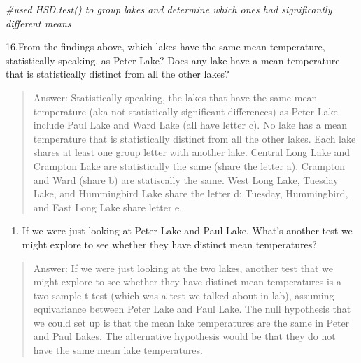 \documentclass[
]{article}
\newenvironment{Shaded}{\begin{snugshade}}{\end{snugshade}}
\newcommand{\CommentTok}[1]{\textcolor[rgb]{0.56,0.35,0.01}{\textit{#1}}}
\providecommand{\tightlist}{%
  \setlength{\itemsep}{0pt}\setlength{\parskip}{0pt}}
\begin{document}
\begin{Shaded}
\begin{Highlighting}[]
\CommentTok{\#used HSD.test() to group lakes and determine which ones had significantly different means}
\end{Highlighting}
\end{Shaded}

16.From the findings above, which lakes have the same mean temperature,
statistically speaking, as Peter Lake? Does any lake have a mean
temperature that is statistically distinct from all the other lakes?

\begin{quote}
Answer: Statistically speaking, the lakes that have the same mean
temperature (aka not statistically significant differences) as Peter
Lake include Paul Lake and Ward Lake (all have letter c). No lake has a
mean temperature that is statistically distinct from all the other
lakes. Each lake shares at least one group letter with another lake.
Central Long Lake and Crampton Lake are statistically the same (share
the letter a). Crampton and Ward (share b) are statiscally the same.
West Long Lake, Tuesday Lake, and Hummingbird Lake share the letter d;
Tuesday, Hummingbird, and East Long Lake share letter e.
\end{quote}

\begin{enumerate}
\def\labelenumi{\arabic{enumi}.}
\setcounter{enumi}{16}
\tightlist
\item
  If we were just looking at Peter Lake and Paul Lake. What's another
  test we might explore to see whether they have distinct mean
  temperatures?
\end{enumerate}

\begin{quote}
Answer: If we were just looking at the two lakes, another test that we
might explore to see whether they have distinct mean temperatures is a
two sample t-test (which was a test we talked about in lab), assuming
equivariance between Peter Lake and Paul Lake. The null hypothesis that
we could set up is that the mean lake temperatures are the same in Peter
and Paul Lakes. The alternative hypothesis would be that they do not
have the same mean lake temperatures.
\end{quote}
\end{document}
